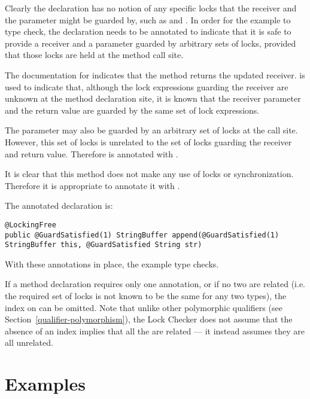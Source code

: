 Clearly the declaration has no notion of any specific locks that the receiver
and the  parameter might be guarded by, such as  and .
In order for the example to type check, the declaration needs to be annotated
to indicate that it is safe to provide a receiver and a parameter guarded by
arbitrary sets of locks, provided that those locks are held at the method
call site.

The documentation for 
indicates that the method returns the updated receiver.
 is used
to indicate that, although the lock expressions guarding the receiver
are unknown at the method declaration site, it is known that the receiver
parameter and the return value are guarded by the same set of lock expressions.

The parameter  may also be guarded by an arbitrary set of locks at the call
site.  However, this set of locks is unrelated to the set of locks guarding
the receiver and return value.  Therefore  is annotated with
.

It is clear that this method does not make any use of
locks or synchronization.  Therefore it is appropriate to annotate it
with .

The annotated declaration is:

\begin{verbatim}
@LockingFree
public @GuardSatisfied(1) StringBuffer append(@GuardSatisfied(1) StringBuffer this, @GuardSatisfied String str)
\end{verbatim}

With these annotations in place, the example type checks.

If a method declaration requires only one  annotation, or if
no two  are related (i.e. the required set of locks is not known
to be the same for any two types), the index on  can be omitted.
Note that unlike other polymorphic qualifiers (see Section~\ref{qualifier-polymorphism}), the Lock Checker does not assume
that the absence of an index implies that all the  are related
--- it instead assumes they are all unrelated.

\section{Examples\label{lock-examples}}

